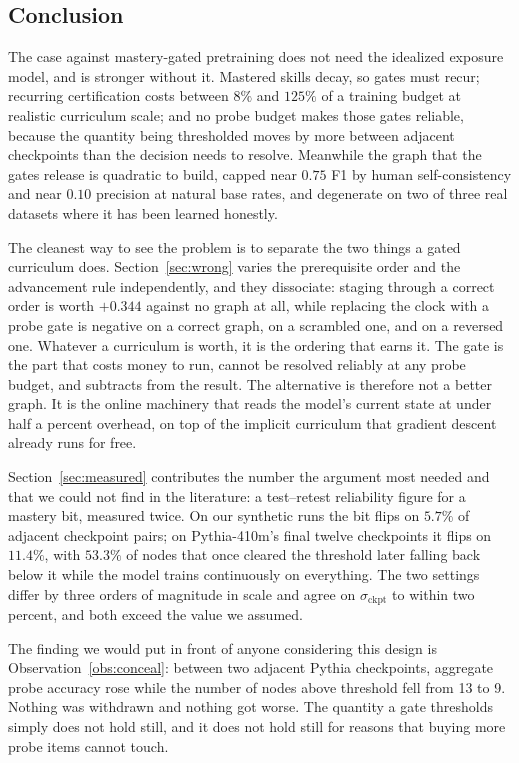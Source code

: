 \documentclass[11pt]{article}
\theoremstyle{plain}
\theoremstyle{definition}
\theoremstyle{remark}
\begin{document}
\subsection{Conclusion}

The case against mastery-gated pretraining does not need the idealized exposure
model, and is stronger without it. Mastered skills decay, so gates must recur;
recurring certification costs between $8\%$ and $125\%$ of a training budget at
realistic curriculum scale; and no probe budget makes those gates reliable,
because the quantity being thresholded moves by more between adjacent checkpoints
than the decision needs to resolve. Meanwhile the graph that the gates release is
quadratic to build, capped near $0.75$ F1 by human self-consistency and near
$0.10$ precision at natural base rates, and degenerate on two of three real
datasets where it has been learned honestly.

The cleanest way to see the problem is to separate the two things a gated
curriculum does. Section~\ref{sec:wrong} varies the prerequisite order and the
advancement rule independently, and they dissociate: staging through a correct
order is worth $+0.344$ against no graph at all, while replacing the clock with a
probe gate is negative on a correct graph, on a scrambled one, and on a reversed
one. Whatever a curriculum is worth, it is the ordering that earns it. The gate
is the part that costs money to run, cannot be resolved reliably at any probe
budget, and subtracts from the result. The alternative is therefore not a better
graph. It is the online machinery that reads the model's current state at under
half a percent overhead, on top of the implicit curriculum that gradient descent
already runs for free.

Section~\ref{sec:measured} contributes the number the argument most needed and
that we could not find in the literature: a test--retest reliability figure for a
mastery bit, measured twice. On our synthetic runs the bit flips on $5.7\%$ of
adjacent checkpoint pairs; on Pythia-410m's final twelve checkpoints it flips on
$11.4\%$, with $53.3\%$ of nodes that once cleared the threshold later falling
back below it while the model trains continuously on everything. The two settings
differ by three orders of magnitude in scale and agree on $\sigma_{\text{ckpt}}$
to within two percent, and both exceed the value we assumed.

The finding we would put in front of anyone considering this design is
Observation~\ref{obs:conceal}: between two adjacent Pythia checkpoints, aggregate
probe accuracy rose while the number of nodes above threshold fell from 13 to 9.
Nothing was withdrawn and nothing got worse. The quantity a gate thresholds
simply does not hold still, and it does not hold still for reasons that buying
more probe items cannot touch.
\end{document}
